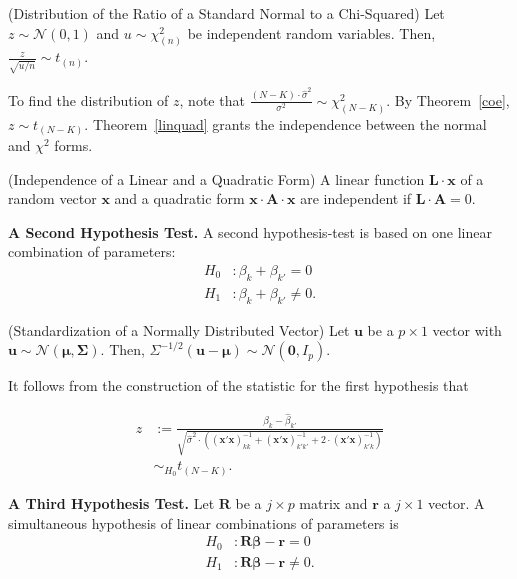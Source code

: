 \begin{theorem} \label{coe} (Distribution of the Ratio of a Standard Normal to a Chi-Squared) Let $z \sim \mathcal{N} \left( 0, 1 \right)$ and $u \sim \chi_{(n)}^2$ be independent random variables. Then, $\frac{z}{\sqrt{u/n}} \sim t_{(n)}$.
\end{theorem}

\noindent To find the distribution of $z$, note that $\frac{ \left( N - K \right) \cdot  \hat{\sigma}^2 }{ \sigma^2 } \sim \chi_{(N-K)}^2$. By Theorem~\ref{coe}, $z \sim t_{(N - K)}$. Theorem~\ref{linquad} grants the independence between the normal and $\chi^2$ forms. 

\begin{theorem} \label{linquad} (Independence of a Linear and a Quadratic Form) A linear function $\bm{L} \cdot \bm{x}$ of a random vector $\bm{x}$ and a quadratic form $\bm{x} \cdot \bm{A} \cdot \bm{x}$ are independent if $\bm{L} \cdot \bm{A}=0$. 
\end{theorem}

\noindent \textbf{A Second Hypothesis Test.} A second hypothesis-test is based on one linear combination of parameters: 
\begin{align}
	H_0 & : \beta_k  + \beta_{k'}  = 0 \nonumber \\ 
	H_1 & : \beta_k  + \beta_{k'}  \neq 0  \nonumber. 
\end{align}

\begin{theorem} (Standardization of a Normally Distributed Vector) \label{stand} Let $\bm{u}$ be a $p \times 1$ vector with $\bm{u} \sim \mathcal{N} \left( \bm{\mu}, \bm{\Sigma} \right)$. Then, ${\Sigma}^{-1/2} \left( \bm{u} - \bm{\mu} \right)\sim \mathcal{N} \left( \bm{0}, I_p \right)$. 
\end{theorem}

\noindent It follows from the construction of the statistic for the first hypothesis that

\begin{align}
z & := \frac{\hat{\beta}_k - \hat{\beta}_{k'} } { \sqrt{ \hat{\sigma}^2 \cdot \left(  { \left( \bm{x}' \bm{x}  \right) }_{kk}^{-1} + \left( \bm{x}' \bm{x}  \right)_{k'k'}^{-1} +  2 \cdot \left( \bm{x}' \bm{x}  \right)_{k'k}^{-1} \right) } } \nonumber \\
  & \sim_{H_0} t_{(N-K)}. 
\end{align}

\noindent \textbf{A Third Hypothesis Test.} Let $\bm{R}$ be a $j \times p$ matrix and $\bm{r}$ a $j \times 1$ vector. A simultaneous hypothesis of linear combinations of parameters is 
\begin{align}
	H_0 & : \bm{R} \bm{\beta} - \bm{r}  = 0 \nonumber \\ 
	H_1 & : \bm{R} \bm{\beta} - \bm{r}  \neq 0  \nonumber. 
\end{align}

